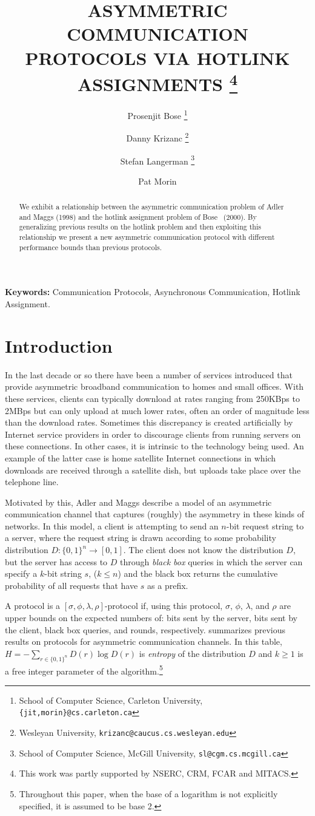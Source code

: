 \documentclass[lotsofwhite]{patmorin}
\title{\MakeUppercase{Asymmetric Communication Protocols via Hotlink
    Assignments}%
  \thanks{This work was partly supported by NSERC,
    CRM, FCAR and MITACS.}}
\author{Prosenjit Bose%
  \thanks{School of Computer Science, Carleton University, 
    \texttt{\{jit,morin\}@cs.carleton.ca}} \and
  Danny Krizanc%
  \thanks{Wesleyan University, \texttt{krizanc@caucus.cs.wesleyan.edu}} \and
  Stefan Langerman%
  \thanks{School of Computer Science, McGill University, 
    \texttt{sl@cgm.cs.mcgill.ca}} \and
  Pat Morin\footnotemark[2]
}
\date{}
\newcommand{\sbits}{\sigma}
\newcommand{\cbits}{\phi}
\newcommand{\bbq}{\lambda}
\newcommand{\rounds}{\rho}
\begin{document}
\maketitle

\begin{abstract}
We exhibit a relationship between the asymmetric communication problem
of Adler and Maggs (1998) and the hotlink assignment problem of Bose
\etal\ (2000). By generalizing previous results on the hotlink problem
and then exploiting this relationship we present a new asymmetric
communication protocol with different performance bounds than previous
protocols.
\end{abstract}

\noindent\textbf{Keywords:} Communication Protocols, Asynchronous
Communication, Hotlink Assignment.


\section{Introduction}

In the last decade or so there have been a number of services
introduced that provide asymmetric broadband communication to homes
and small offices.  With these services, clients can typically
download at rates ranging from 250KBps to 2MBps but can only upload at
much lower rates, often an order of magnitude less than the download
rates.  Sometimes this discrepancy is created artificially by Internet
service providers in order to discourage clients from running servers
on these connections.  In other cases, it is intrinsic to the
technology being used.  An example of the latter case is home satellite
Internet connections in which downloads are received through a
satellite dish, but uploads take place over the telephone line.

Motivated by this, Adler and Maggs \cite{am98} describe a model of an
asymmetric communication channel that captures (roughly) the asymmetry
in these kinds of networks.  In this model, a client is attempting to
send an $n$-bit request string to a server, where the request string
is drawn according to some probability distribution
$D:\{0,1\}^n\rightarrow [0,1]$.  The client does not know the
distribution $D$, but the server has access to $D$ through \emph{black
box} queries in which the server can specify a $k$-bit string $s$,
($k\le n$) and the black box returns the cumulative probability of all
requests that have $s$ as a prefix.

A protocol is a $[\sbits,\cbits,\bbq,\rounds]$-protocol if, using this
protocol, $\sbits$, $\cbits$, $\bbq$, and $\rounds$ are upper bounds
on the expected numbers of: bits sent by the server, bits sent by the
client, black box queries, and rounds, respectively.
 summarizes previous results on protocols for
asymmetric communication channels.  In this table,
$H=-\sum_{r\in\{0,1\}^n} D(r)\log D(r)$ is \emph{entropy} of the
distribution $D$ and $k\ge 1$ is a free integer parameter of the
algorithm.\footnote{Throughout this paper, when the base of a
logarithm is not explicitly specified, it is assumed to be base 2.}
\end{document}
